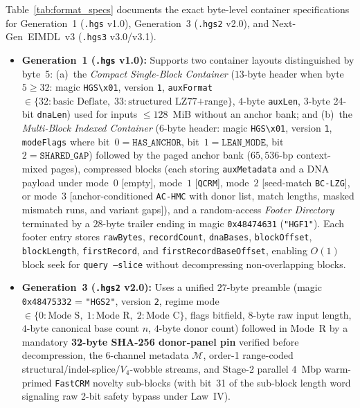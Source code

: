 \documentclass[10pt]{article}
\theoremstyle{definition}
\begin{document}
Table~\ref{tab:format_specs} documents the exact byte-level container specifications for Generation~1 (\texttt{.hgs} v1.0), Generation~3 (\texttt{.hgs2} v2.0), and Next-Gen~EIMDL~v3 (\texttt{.hgs3} v3.0/v3.1).
\begin{itemize}
  \item \textbf{Generation~1 (\texttt{.hgs} v1.0):} Supports two container layouts distinguished by byte~5:
  (a)~the \emph{Compact Single-Block Container} ($13$-byte header when byte~$5 \ge 32$: magic \texttt{HGS\textbackslash x01}, version \texttt{1}, \texttt{auxFormat} $\in \{32:\text{basic Deflate},\; 33:\text{structured LZ77+range}\}$, $4$-byte \texttt{auxLen}, $3$-byte 24-bit \texttt{dnaLen}) used for inputs $\le 128$~MiB without an anchor bank; and
  (b)~the \emph{Multi-Block Indexed Container} ($6$-byte header: magic \texttt{HGS\textbackslash x01}, version \texttt{1}, \texttt{modeFlags} where bit~$0 = \texttt{HAS\_ANCHOR}$, bit~$1 = \texttt{LEAN\_MODE}$, bit~$2 = \texttt{SHARED\_GAP}$) followed by the paged anchor bank ($65,536$-bp context-mixed pages), compressed blocks (each storing \texttt{auxMetadata} and a DNA payload under mode~$0$ [empty], mode~$1$ [\texttt{QCRM}], mode~$2$ [seed-match \texttt{BC-LZG}], or mode~$3$ [anchor-conditioned \texttt{AC-HMC} with donor list, match lengths, masked mismatch runs, and variant gaps]), and a random-access \emph{Footer Directory} terminated by a $28$-byte trailer ending in magic \texttt{0x48474631} (\texttt{"HGF1"}). Each footer entry stores \texttt{rawBytes}, \texttt{recordCount}, \texttt{dnaBases}, \texttt{blockOffset}, \texttt{blockLength}, \texttt{firstRecord}, and \texttt{firstRecordBaseOffset}, enabling $O(1)$ block seek for \texttt{query --slice} without decompressing non-overlapping blocks.
  \item \textbf{Generation~3 (\texttt{.hgs2} v2.0):} Uses a unified $27$-byte preamble (magic \texttt{0x48475332} = \texttt{"HGS2"}, version \texttt{2}, regime mode $\in \{0:\text{Mode~S},\; 1:\text{Mode~R},\; 2:\text{Mode~C}\}$, flags bitfield, $8$-byte raw input length, $4$-byte canonical base count $n$, $4$-byte donor count) followed in Mode~R by a mandatory \textbf{32-byte SHA-256 donor-panel pin} verified before decompression, the 6-channel metadata $\mathcal{M}$, order-1 range-coded structural/indel-splice/$V_4$-wobble streams, and Stage-2 parallel $4$~Mbp warm-primed \texttt{FastCRM} novelty sub-blocks (with bit~31 of the sub-block length word signaling raw 2-bit safety bypass under Law~IV).

\end{itemize}
\end{document}

